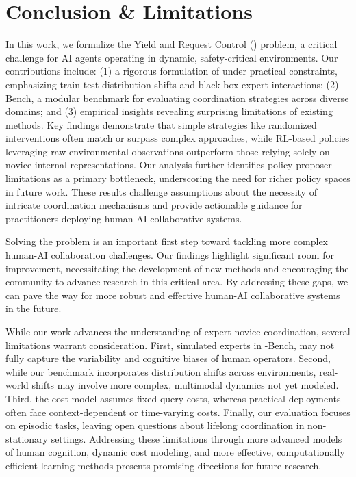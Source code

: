 \section{Conclusion \& Limitations}

In this work, we formalize the Yield and Request Control (\ourMethod) problem, a critical challenge for AI agents operating in dynamic, safety-critical environments. Our contributions include: (1) a rigorous formulation of \ourMethod under practical constraints, emphasizing train-test distribution shifts and black-box expert interactions; (2) \ourMethod-Bench, a modular benchmark for evaluating coordination strategies across diverse domains; and (3) empirical insights revealing surprising limitations of existing methods. Key findings demonstrate that simple strategies like randomized interventions often match or surpass complex approaches, while RL-based policies leveraging raw environmental observations outperform those relying solely on novice internal representations. Our analysis further identifies policy proposer limitations as a primary bottleneck, underscoring the need for richer policy spaces in future work. These results challenge assumptions about the necessity of intricate coordination mechanisms and provide actionable guidance for practitioners deploying human-AI collaborative systems.

Solving the \ourMethod problem is an important first step toward tackling more complex human-AI collaboration challenges. Our findings highlight significant room for improvement, necessitating the development of new methods and encouraging the community to advance research in this critical area. By addressing these gaps, we can pave the way for more robust and effective human-AI collaborative systems in the future.

While our work advances the understanding of expert-novice coordination, several limitations warrant consideration. First, simulated experts in \ourMethod-Bench, may not fully capture the variability and cognitive biases of human operators. Second, while our benchmark incorporates distribution shifts across environments, real-world shifts may involve more complex, multimodal dynamics not yet modeled. Third, the cost model assumes fixed query costs, whereas practical deployments often face context-dependent or time-varying costs. Finally, our evaluation focuses on episodic tasks, leaving open questions about lifelong coordination in non-stationary settings. %
Addressing these limitations through more advanced models of human cognition, dynamic cost modeling, and more effective, computationally efficient learning methods presents promising directions for future research.

